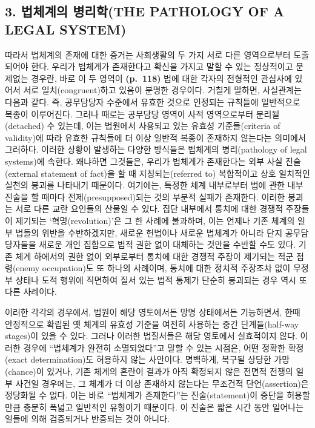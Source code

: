 \subsection{3. 법체계의 병리학(THE PATHOLOGY OF A LEGAL
SYSTEM)}\label{uxbc95uxccb4uxacc4uxc758-uxbcd1uxb9acuxd559the-pathology-of-a-legal-system}

따라서 법체계의 존재에 대한 증거는 사회생활의 두 가지 서로 다른
영역으로부터 도출되어야 한다. 우리가 법체계가 존재한다고 확신을 가지고
말할 수 있는 정상적이고 문제없는 경우란, 바로 이 두 영역이
\textbf{(p.~118)} 법에 대한 각자의 전형적인 관심사에 있어서 서로
일치(congruent)하고 있음이 분명한 경우이다. 거칠게 말하면, 사실관계는
다음과 같다. 즉, 공무담당자 수준에서 유효한 것으로 인정되는 규칙들에
일반적으로 복종이 이루어진다. 그러나 때로는 공무담당 영역이 사적
영역으로부터 분리될(detached) 수 있는데, 이는 법원에서 사용되고 있는
유효성 기준들(criteria of validity)에 따라 유효한 규칙들에 더 이상
일반적 복종이 존재하지 않는다는 의미에서 그러하다. 이러한 상황이
발생하는 다양한 방식들은 법체계의 병리(pathology of legal systems)에
속한다. 왜냐하면 그것들은, 우리가 법체계가 존재한다는 외부 사실
진술(external statement of fact)을 할 때 지칭되는(referred to)
복합적이고 상호 일치적인 실천의 붕괴를 나타내기 때문이다. 여기에는,
특정한 체계 내부로부터 법에 관한 내부 진술을 할 때마다
전제(presupposed)되는 것의 부분적 실패가 존재한다. 이러한 붕괴는 서로
다른 교란 요인들의 산물일 수 있다. 집단 내부에서 통치에 대한 경쟁적
주장들이 제기되는 ‘혁명(revolution)’은 그 한 사례에 불과하며, 이는
언제나 기존 체계의 일부 법들의 위반을 수반하겠지만, 새로운 헌법이나
새로운 법체계가 아니라 단지 공무담당자들을 새로운 개인 집합으로 법적
권한 없이 대체하는 것만을 수반할 수도 있다. 기존 체계 하에서의 권한 없이
외부로부터 통치에 대한 경쟁적 주장이 제기되는 적군 점령(enemy
occupation)도 또 하나의 사례이며, 통치에 대한 정치적 주장조차 없이
무정부 상태나 도적 행위에 직면하여 질서 있는 법적 통제가 단순히 붕괴되는
경우 역시 또 다른 사례이다.

이러한 각각의 경우에서, 법원이 해당 영토에서든 망명 상태에서든
기능하면서, 한때 안정적으로 확립된 옛 체계의 유효성 기준을 여전히
사용하는 중간 단계들(half-way stages)이 있을 수 있다. 그러나 이러한
법질서들은 해당 영토에서 실효적이지 않다. 이러한 경우에 “법체계가
완전히 소멸되었다”고 말할 수 있는 시점은, 어떤 정확한 확정(exact
determination)도 허용하지 않는 사안이다. 명백하게, 복구될 상당한
가망(chance)이 있거나, 기존 체계의 혼란이 결과가 아직 확정되지 않은
전면적 전쟁의 일부 사건일 경우에는, 그 체계가 더 이상 존재하지 않는다는
무조건적 단언(assertion)은 정당화될 수 없다. 이는 바로 “법체계가
존재한다”는 진술(statement)이 중단을 허용할 만큼 충분히 폭넓고 일반적인
유형이기 때문이다. 이 진술은 짧은 시간 동안 일어나는 일들에 의해
검증되거나 반증되는 것이 아니다.

